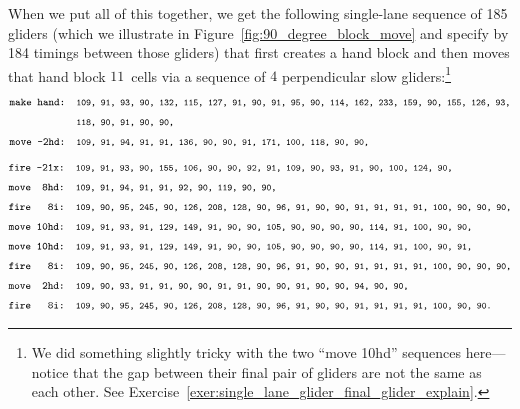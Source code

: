 When we put all of this together, we get the following single-lane sequence of 185 gliders (which we illustrate in Figure~\ref{fig:90_degree_block_move} and specify by 184 timings between those gliders) that first creates a hand block and then moves that hand block $11$~cells via a sequence of $4$ perpendicular slow gliders:\footnote{We did something slightly tricky with the two ``move 10hd'' sequences here---notice that the gap between their final pair of gliders are not the same as each other. See Exercise~\ref{exer:single_lane_glider_final_glider_explain}.}
\begin{align*}
& \text{\texttt{\footnotesize make hand: {\scriptsize 109, 91, 93, 90, 132, 115, 127, 91, 90, 91, 95, 90, 114, 162, 233, 159, 90, 155, 126, 93,}}} \\
& \text{\texttt{\footnotesize ~~~~~~~~~~~~{\scriptsize 118, 90, 91, 90, 90,}}} \\
& \text{\texttt{\footnotesize move -2hd: {\scriptsize 109, 91, 94, 91, 91, 136, 90, 90, 91, 171, 100, 118, 90, 90,}}}
\end{align*}
\begin{align*}
& \text{\texttt{\footnotesize fire -21x: {\scriptsize 109, 91, 93, 90, 155, 106, 90, 90, 92, 91, 109, 90, 93, 91, 90, 100, 124, 90,}}} \\
& \text{\texttt{\footnotesize move~~8hd: {\scriptsize 109, 91, 94, 91, 91, 92, 90, 119, 90, 90,}}} \\
& \text{\texttt{\footnotesize fire~~~8i: {\scriptsize 109, 90, 95, 245, 90, 126, 208, 128, 90, 96, 91, 90, 90, 91, 91, 91, 91, 100, 90, 90, 90,}}} \\
& \text{\texttt{\footnotesize move~10hd: {\scriptsize 109, 91, 93, 91, 129, 149, 91, 90, 90, 105, 90, 90, 90, 90, 114, 91, 100, 90, 90,}}} \\
& \text{\texttt{\footnotesize move~10hd: {\scriptsize 109, 91, 93, 91, 129, 149, 91, 90, 90, 105, 90, 90, 90, 90, 114, 91, 100, 90, 91,}}} \\
& \text{\texttt{\footnotesize fire~~~8i: {\scriptsize 109, 90, 95, 245, 90, 126, 208, 128, 90, 96, 91, 90, 90, 91, 91, 91, 91, 100, 90, 90, 90,}}} \\
& \text{\texttt{\footnotesize move~~2hd: {\scriptsize 109, 90, 93, 91, 91, 90, 90, 91, 91, 90, 90, 91, 90, 90, 94, 90, 90,}}} \\
& \text{\texttt{\footnotesize fire~~~8i: {\scriptsize 109, 90, 95, 245, 90, 126, 208, 128, 90, 96, 91, 90, 90, 91, 91, 91, 91, 100, 90, 90.}}}
\end{align*}

